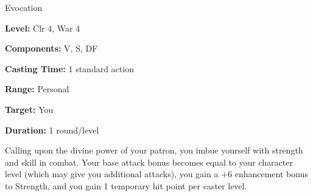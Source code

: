 
Evocation

\textbf{Level:} Clr 4, War 4

\textbf{Components:} V, S, DF

\textbf{Casting Time:} 1 standard action

\textbf{Range:} Personal

\textbf{Target:} You

\textbf{Duration:} 1 round/level

Calling upon the divine power of your patron, you imbue yourself with strength 
and skill in combat. Your base attack bonus becomes equal to your character level 
(which may give you additional attacks), you gain a +6 enhancement bonus to Strength, 
and you gain 1 temporary hit point per caster level.

